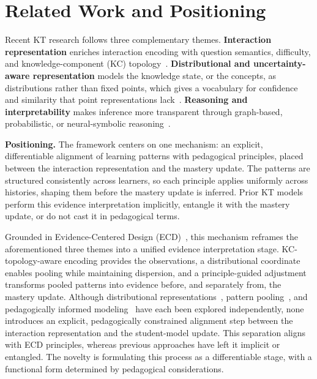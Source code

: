 \documentclass[conference]{IEEEtran}
\begin{document}
\section{Related Work and Positioning}
\label{sec:related}

Recent KT research follows three complementary themes. \textbf{Interaction representation} enriches interaction encoding with question semantics, difficulty, and knowledge-component (KC) topology~\cite{li2025mckt, xia2025cmdkt}. \textbf{Distributional and uncertainty-aware representation} models the knowledge state, or the concepts, as distributions rather than fixed points, which gives a vocabulary for confidence and similarity that point representations lack~\cite{chen2025ukt, li2025keenkt, wu2026sskt}. \textbf{Reasoning and interpretability} makes inference more transparent through graph-based, probabilistic, or neural-symbolic reasoning~\cite{nakagawa2019gkt, zhou2024psikt, hooshyar2026nskt, wu2026plkt}.

\smallskip\noindent\textbf{Positioning.} The framework centers on one mechanism: an explicit, differentiable alignment of learning patterns with pedagogical principles, placed between the interaction representation and the mastery update. The patterns are structured consistently across learners, so each principle applies uniformly across histories, shaping them before the mastery update is inferred. Prior KT models perform this evidence interpretation implicitly, entangle it with the mastery update, or do not cast it in pedagogical terms.

Grounded in Evidence-Centered Design (ECD)~\cite{mislevy2005ecd}, this mechanism reframes the aforementioned three themes into a unified evidence interpretation stage. KC-topology-aware encoding provides the observations, a distributional coordinate enables pooling while maintaining dispersion, and a principle-guided adjustment transforms pooled patterns into evidence before, and separately from, the mastery update. Although distributional representations~\cite{zhou2024psikt,wu2026plkt,li2025keenkt}, pattern pooling~\cite{wu2026plkt}, and pedagogically informed modeling~\cite{hooshyar2026nskt} have each been explored independently, none introduces an explicit, pedagogically constrained alignment step between the interaction representation and the student-model update. This separation aligns with ECD principles, whereas previous approaches have left it implicit or entangled. The novelty is formulating this process as a differentiable stage, with a functional form determined by pedagogical considerations.
\end{document}
